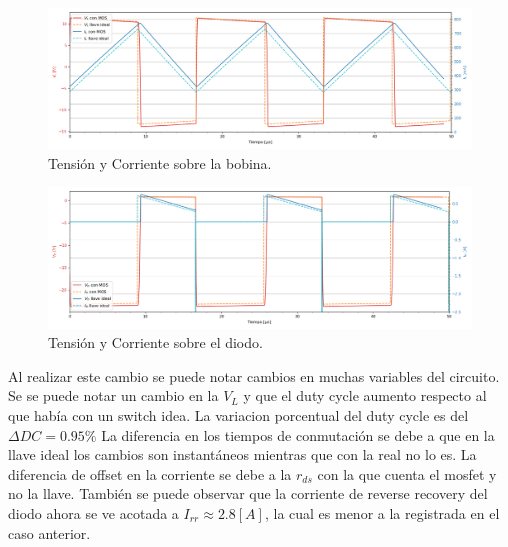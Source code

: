 \begin{multicols}{2}
\begin{figure}[H]
	\centering
	\includegraphics[width=0.9\linewidth]{ImagenesEjercicio-3/il-vl-2v3}
	\caption{Tensión y Corriente sobre la bobina.}
	\label{fig:ej3:Il_Vl}
\end{figure}
\begin{figure}[H]
	\centering
	\includegraphics[width=0.9\linewidth]{ImagenesEjercicio-3/id-vd-2v3}
	\caption{Tensión y Corriente sobre el diodo.}
	\label{fig:ej3:Id_Vd}
\end{figure}
\end{multicols}
Al realizar este cambio se puede notar cambios en muchas variables del circuito.
Se  se puede notar un cambio en la $V_L$ y que el duty cycle aumento respecto al que había con un switch idea.
La variacion porcentual del duty cycle es del $\Delta DC  =0.95 \% $
La diferencia en los tiempos de conmutación se debe a que en la llave ideal los cambios son instantáneos mientras que con la real no lo es.
La diferencia de offset en la corriente se debe a la $r_{ds}$ con la que cuenta el mosfet y no la llave. 
También se puede observar que la corriente de reverse recovery del diodo ahora se ve acotada a $I_{rr}\approx 2.8[A]$, la cual es menor a la registrada en el caso anterior.

